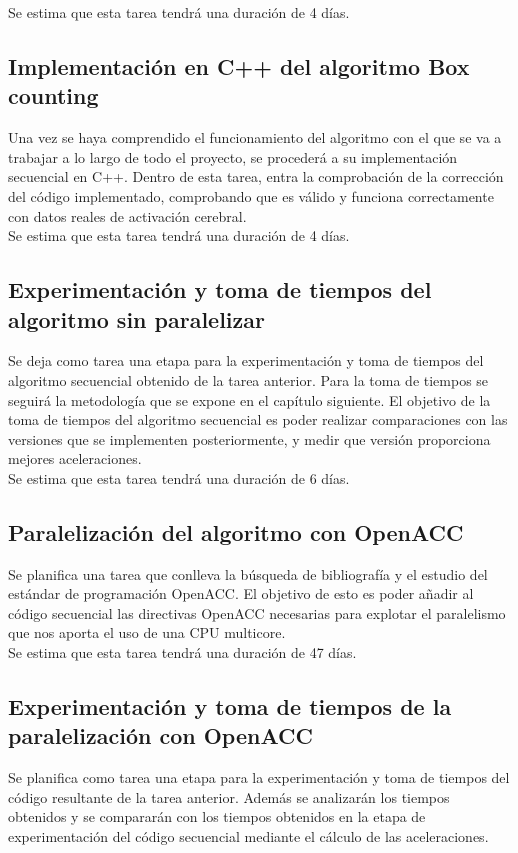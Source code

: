 Se estima que esta tarea tendrá una duración de 4 días.

\subsection{Implementación en C++ del algoritmo Box counting}
Una vez se haya comprendido el funcionamiento del algoritmo con el que se va a trabajar a lo largo de todo el proyecto, se procederá a su implementación secuencial en C++. Dentro de esta tarea, entra la comprobación de la corrección del código implementado, comprobando que es válido y funciona correctamente con datos reales de activación cerebral.\\

Se estima que esta tarea tendrá una duración de 4 días.

\subsection{Experimentación y toma de tiempos del algoritmo sin paralelizar}
Se deja como tarea una etapa para la experimentación y toma de tiempos del algoritmo secuencial obtenido de la tarea anterior. Para la toma de tiempos se seguirá la metodología que se expone en el capítulo siguiente. El objetivo de la toma de tiempos del algoritmo secuencial es poder realizar comparaciones con las versiones que se implementen posteriormente, y medir que versión proporciona mejores aceleraciones.\\

Se estima que esta tarea tendrá una duración de 6 días.

\subsection{Paralelización del algoritmo con OpenACC}
Se planifica una tarea que conlleva la búsqueda de bibliografía y el estudio del estándar de programación OpenACC. El objetivo de esto es poder añadir al código secuencial las directivas OpenACC necesarias para explotar el paralelismo que nos aporta el uso de una CPU multicore.\\

Se estima que esta tarea tendrá una duración de 47 días.

\subsection{Experimentación y toma de tiempos de la paralelización con OpenACC}
Se planifica como tarea una etapa para la experimentación y toma de tiempos del código resultante de la tarea anterior. Además se analizarán los tiempos obtenidos y se compararán con los tiempos obtenidos en la etapa de experimentación del código secuencial mediante el cálculo de las aceleraciones.\\


